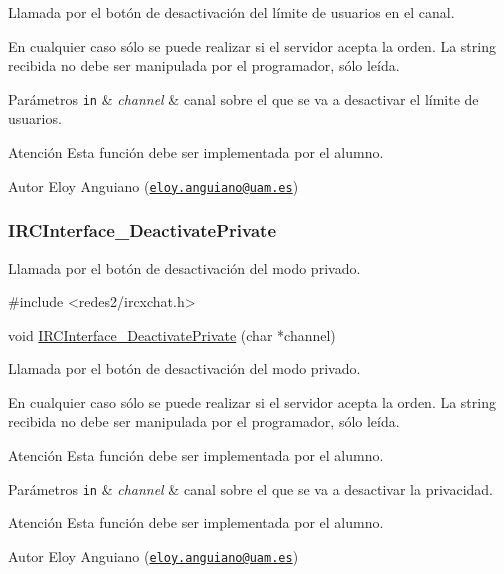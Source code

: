 Llamada por el botón de desactivación del límite de usuarios en el canal.

En cualquier caso sólo se puede realizar si el servidor acepta la orden. La string recibida no debe ser manipulada por el programador, sólo leída.


\begin{DoxyParams}[1]{Parámetros}
\mbox{\tt in}  & {\em channel} & canal sobre el que se va a desactivar el límite de usuarios.\\
\hline
\end{DoxyParams}
\begin{DoxyWarning}{Atención}
Esta función debe ser implementada por el alumno.
\end{DoxyWarning}
\begin{DoxyAuthor}{Autor}
Eloy Anguiano (\href{mailto:eloy.anguiano@uam.es}{\tt eloy.\+anguiano@uam.\+es})
\end{DoxyAuthor}


 \hypertarget{IRCInterface_DeactivatePrivate}{}\subsubsection{I\+R\+C\+Interface\+\_\+\+Deactivate\+Private}\label{IRCInterface_DeactivatePrivate}
Llamada por el botón de desactivación del modo privado.


\begin{DoxyCode}
\textcolor{preprocessor}{#include <redes2/ircxchat.h>}

\textcolor{keywordtype}{void} \hyperlink{G-2313-06-P2__client_8c_a8a6141803691ba327f11ba763ad075d4}{IRCInterface\_DeactivatePrivate} (\textcolor{keywordtype}{char} *channel)
\end{DoxyCode}


Llamada por el botón de desactivación del modo privado.

En cualquier caso sólo se puede realizar si el servidor acepta la orden. La string recibida no debe ser manipulada por el programador, sólo leída.

\begin{DoxyWarning}{Atención}
Esta función debe ser implementada por el alumno.
\end{DoxyWarning}

\begin{DoxyParams}[1]{Parámetros}
\mbox{\tt in}  & {\em channel} & canal sobre el que se va a desactivar la privacidad.\\
\hline
\end{DoxyParams}
\begin{DoxyWarning}{Atención}
Esta función debe ser implementada por el alumno.
\end{DoxyWarning}
\begin{DoxyAuthor}{Autor}
Eloy Anguiano (\href{mailto:eloy.anguiano@uam.es}{\tt eloy.\+anguiano@uam.\+es})
\end{DoxyAuthor}


